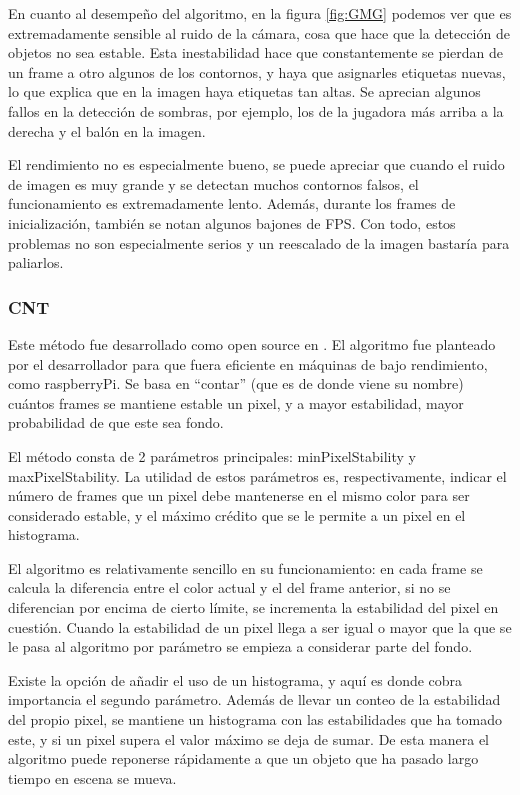 En cuanto al desempeño del algoritmo, en la figura \ref{fig:GMG} podemos ver que es extremadamente sensible al ruido de la cámara, cosa que hace que la detección de objetos no sea estable. Esta inestabilidad hace que constantemente se pierdan de un frame a otro algunos de los contornos, y haya que asignarles etiquetas nuevas, lo que explica que en la imagen haya etiquetas tan altas. Se aprecian algunos fallos en la detección de sombras, por ejemplo, los de la jugadora más arriba a la derecha y el balón en la imagen. 

El rendimiento no es especialmente bueno, se puede apreciar que cuando el ruido de imagen es muy grande y se detectan muchos contornos falsos, el funcionamiento es extremadamente lento. Además, durante los frames de inicialización, también se notan algunos bajones de FPS. Con todo, estos problemas no son especialmente serios y un reescalado de la imagen bastaría para paliarlos.


\subsubsection*{CNT}
Este método fue desarrollado como open source en \cite{git:CNT}. El algoritmo fue planteado por el desarrollador para que fuera eficiente en máquinas de bajo rendimiento, como raspberryPi. Se basa en ``contar'' (que es de donde viene su nombre) cuántos frames se mantiene estable un pixel, y a mayor estabilidad, mayor probabilidad de que este sea fondo.

El método consta de 2 parámetros principales: minPixelStability y maxPixelStability. La utilidad de estos parámetros es, respectivamente, indicar el número de frames que un pixel debe mantenerse en el mismo color para ser considerado estable, y el máximo crédito que se le permite a un pixel en el histograma.

El algoritmo es relativamente sencillo en su funcionamiento: en cada frame se calcula la diferencia entre el color actual y el del frame anterior, si no se diferencian por encima de cierto límite, se incrementa la estabilidad del pixel en cuestión. Cuando la estabilidad de un pixel llega a ser igual o mayor que la que se le pasa al algoritmo por parámetro se empieza a considerar parte del fondo.

Existe la opción de añadir el uso de un histograma, y aquí es donde cobra importancia el segundo parámetro. Además de llevar un conteo de la estabilidad del propio pixel, se mantiene un histograma con las estabilidades que ha tomado este, y si un pixel supera el valor máximo se deja de sumar. De esta manera el algoritmo puede reponerse rápidamente a que un objeto que ha pasado largo tiempo en escena se mueva.

